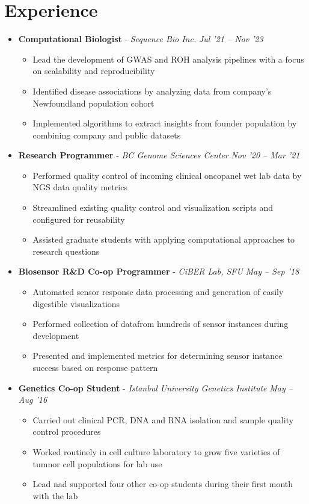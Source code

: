 \documentclass{article}
\newcommand{\experienceheader}[3]{\item \textbf{#1} - \textit{#2} \hfill \textit{#3} \vspace{-.2em}}
\newcommand{\customsection}[1]{\section*{#1} \vspace{-1em} \hrulefill \vspace{-.5em}}
\begin{document}
\customsection{Experience}
\begin{itemize}
  \experienceheader{Computational Biologist}{Sequence Bio Inc.}{Jul '21 -- Nov '23}
    \begin{itemize}
      \item Lead the development of GWAS and ROH analysis pipelines with a focus on scalability and reproducibility
      \item Identified disease associations by analyzing data from company's Newfoundland population cohort
      \item Implemented algorithms to extract insights from founder population by combining company and public datasets
    \end{itemize}
  \experienceheader{Research Programmer}{BC Genome Sciences Center}{Nov '20 -- Mar '21}
    \begin{itemize}
      \item Performed quality control of incoming clinical oncopanel wet lab data by NGS data quality metrics
      \item Streamlined existing quality control and visualization scripts and configured for reusability
      \item Assisted graduate students with applying computational approaches to research questions
    \end{itemize}
  \experienceheader{Biosensor R\&D Co-op Programmer}{CiBER Lab, SFU}{May -- Sep '18}
    \begin{itemize}
      \item Automated sensor response data processing and generation of easily digestible visualizations
      \item Performed collection of datafrom hundreds of sensor instances during development
      \item Presented and implemented metrics for determining sensor instance success based on response pattern
    \end{itemize}
  \experienceheader{Genetics Co-op Student}{Istanbul University Genetics Institute}{May -- Aug '16}
    \begin{itemize}
      \item Carried out clinical PCR, DNA and RNA isolation and sample quality control procedures
      \item Worked routinely in cell culture laboratory to grow five varieties of tumnor cell populations for lab use
      \item Lead nad supported four other co-op students during their first month with the lab
    \end{itemize}
\end{itemize}
\end{document}
